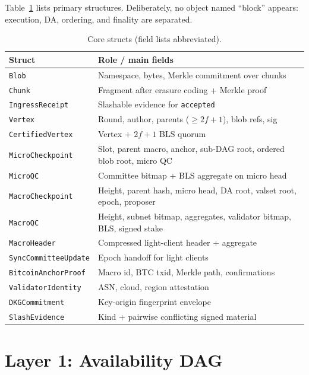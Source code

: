 \documentclass[11pt,a4paper,twoside]{report}
\theoremstyle{definition}
\begin{document}
Table~\ref{tab:structs} lists primary structures. Deliberately, no object named ``block'' appears: execution, DA, ordering, and finality are separated.

\begin{table}[htbp]
  \centering
  \caption{Core structs (field lists abbreviated).}
  \label{tab:structs}
  \small
  \begin{tabular}{@{}p{3.2cm}p{10.5cm}@{}}
    \toprule
    \textbf{Struct} & \textbf{Role / main fields} \\
    \midrule
    \texttt{Blob} & Namespace, bytes, Merkle commitment over chunks \\
    \texttt{Chunk} & Fragment after erasure coding + Merkle proof \\
    \texttt{IngressReceipt} & Slashable evidence for \texttt{accepted} \\
    \texttt{Vertex} & Round, author, parents ($\geq 2f{+}1$), blob refs, sig \\
    \texttt{CertifiedVertex} & Vertex + $2f{+}1$ BLS quorum \\
    \texttt{MicroCheckpoint} & Slot, parent macro, anchor, sub-DAG root, ordered blob root, micro QC \\
    \texttt{MicroQC} & Committee bitmap + BLS aggregate on micro head \\
    \texttt{MacroCheckpoint} & Height, parent hash, micro head, DA root, valset root, epoch, proposer \\
    \texttt{MacroQC} & Height, subnet bitmap, aggregates, validator bitmap, BLS, signed stake \\
    \texttt{MacroHeader} & Compressed light-client header + aggregate \\
    \texttt{SyncCommitteeUpdate} & Epoch handoff for light clients \\
    \texttt{BitcoinAnchorProof} & Macro id, BTC txid, Merkle path, confirmations \\
    \texttt{ValidatorIdentity} & ASN, cloud, region attestation \\
    \texttt{DKGCommitment} & Key-origin fingerprint envelope \\
    \texttt{SlashEvidence} & Kind + pairwise conflicting signed material \\
    \bottomrule
  \end{tabular}
\end{table}

\chapter{Layer 1: Availability DAG}
\label{ch:da}
\end{document}
